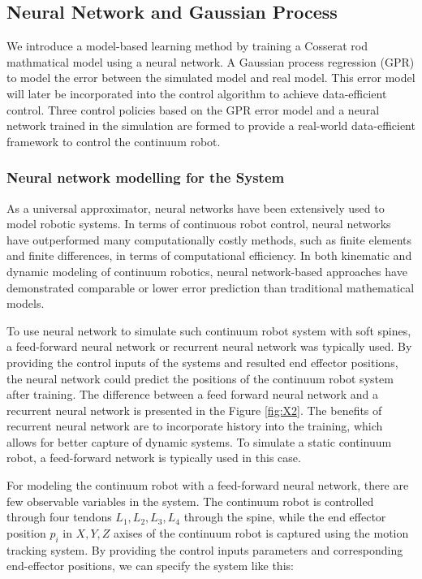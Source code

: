 \subsection{Neural Network and Gaussian Process}

We introduce a model-based learning method by training a Cosserat rod mathmatical model using a neural network. A Gaussian process regression (GPR) to model the error between the simulated model and real model. This error model will later be incorporated into the control algorithm to achieve data-efficient control. Three control policies based on the GPR error model and a neural network trained in the simulation are formed to provide a real-world data-efficient framework to control the continuum robot.

\subsubsection{Neural network modelling for the System}
As a universal approximator, neural networks have been extensively used to model robotic systems. In terms of continuous robot control, neural networks have outperformed many computationally costly methods, such as finite elements and finite differences, in terms of computational efficiency. In both kinematic and dynamic modeling of continuum robotics, neural network-based approaches have demonstrated comparable or lower error prediction than traditional mathematical models.

To use neural network to simulate such continuum robot system with soft spines, a feed-forward neural network or recurrent neural network was typically used. By providing the control inputs of the systems and resulted end effector positions, the neural network could predict the positions of the continuum robot system after training. The difference between a feed forward neural network and a recurrent neural network is presented in the Figure \ref{fig:X2}. The benefits of recurrent neural network are to incorporate history into the training, which allows for better capture of dynamic systems. To simulate a static continuum robot, a feed-forward network is typically used in this case. 

For modeling the continuum robot with a feed-forward neural network, there are few observable variables in the system. The continuum robot is controlled through four tendons $L_1, L_2, L_3, L_4$ through the spine, while the end effector position $p_i$ in $X,Y,Z$ axises of the continuum robot is captured using the motion tracking system. By providing the control inputs parameters and corresponding end-effector positions, we can specify the system like this:

